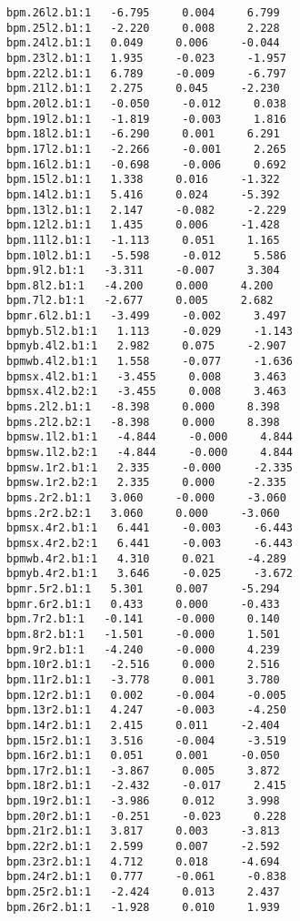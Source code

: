 \begin{verbatim}
bpm.26l2.b1:1   -6.795     0.004     6.799
bpm.25l2.b1:1   -2.220     0.008     2.228
bpm.24l2.b1:1   0.049     0.006     -0.044
bpm.23l2.b1:1   1.935     -0.023     -1.957
bpm.22l2.b1:1   6.789     -0.009     -6.797
bpm.21l2.b1:1   2.275     0.045     -2.230
bpm.20l2.b1:1   -0.050     -0.012     0.038
bpm.19l2.b1:1   -1.819     -0.003     1.816
bpm.18l2.b1:1   -6.290     0.001     6.291
bpm.17l2.b1:1   -2.266     -0.001     2.265
bpm.16l2.b1:1   -0.698     -0.006     0.692
bpm.15l2.b1:1   1.338     0.016     -1.322
bpm.14l2.b1:1   5.416     0.024     -5.392
bpm.13l2.b1:1   2.147     -0.082     -2.229
bpm.12l2.b1:1   1.435     0.006     -1.428
bpm.11l2.b1:1   -1.113     0.051     1.165
bpm.10l2.b1:1   -5.598     -0.012     5.586
bpm.9l2.b1:1   -3.311     -0.007     3.304
bpm.8l2.b1:1   -4.200     0.000     4.200
bpm.7l2.b1:1   -2.677     0.005     2.682
bpmr.6l2.b1:1   -3.499     -0.002     3.497
bpmyb.5l2.b1:1   1.113     -0.029     -1.143
bpmyb.4l2.b1:1   2.982     0.075     -2.907
bpmwb.4l2.b1:1   1.558     -0.077     -1.636
bpmsx.4l2.b1:1   -3.455     0.008     3.463
bpmsx.4l2.b2:1   -3.455     0.008     3.463
bpms.2l2.b1:1   -8.398     0.000     8.398
bpms.2l2.b2:1   -8.398     0.000     8.398
bpmsw.1l2.b1:1   -4.844     -0.000     4.844
bpmsw.1l2.b2:1   -4.844     -0.000     4.844
bpmsw.1r2.b1:1   2.335     -0.000     -2.335
bpmsw.1r2.b2:1   2.335     0.000     -2.335
bpms.2r2.b1:1   3.060     -0.000     -3.060
bpms.2r2.b2:1   3.060     0.000     -3.060
bpmsx.4r2.b1:1   6.441     -0.003     -6.443
bpmsx.4r2.b2:1   6.441     -0.003     -6.443
bpmwb.4r2.b1:1   4.310     0.021     -4.289
bpmyb.4r2.b1:1   3.646     -0.025     -3.672
bpmr.5r2.b1:1   5.301     0.007     -5.294
bpmr.6r2.b1:1   0.433     0.000     -0.433
bpm.7r2.b1:1   -0.141     -0.000     0.140
bpm.8r2.b1:1   -1.501     -0.000     1.501
bpm.9r2.b1:1   -4.240     -0.000     4.239
bpm.10r2.b1:1   -2.516     0.000     2.516
bpm.11r2.b1:1   -3.778     0.001     3.780
bpm.12r2.b1:1   0.002     -0.004     -0.005
bpm.13r2.b1:1   4.247     -0.003     -4.250
bpm.14r2.b1:1   2.415     0.011     -2.404
bpm.15r2.b1:1   3.516     -0.004     -3.519
bpm.16r2.b1:1   0.051     0.001     -0.050
bpm.17r2.b1:1   -3.867     0.005     3.872
bpm.18r2.b1:1   -2.432     -0.017     2.415
bpm.19r2.b1:1   -3.986     0.012     3.998
bpm.20r2.b1:1   -0.251     -0.023     0.228
bpm.21r2.b1:1   3.817     0.003     -3.813
bpm.22r2.b1:1   2.599     0.007     -2.592
bpm.23r2.b1:1   4.712     0.018     -4.694
bpm.24r2.b1:1   0.777     -0.061     -0.838
bpm.25r2.b1:1   -2.424     0.013     2.437
bpm.26r2.b1:1   -1.928     0.010     1.939

\end{verbatim}
